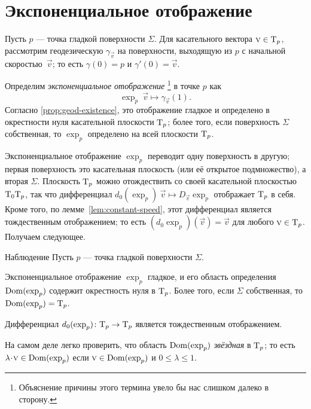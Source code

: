 \section{Экспоненциальное отображение}\label{sec:exp}

Пусть $p$ --- точка гладкой поверхности $\Sigma$.
Для касательного вектора ${\text{\sc{v}}}\in \mathrm{T}_p$, рассмотрим геодезическую $\gamma_{\vec v}$ на поверхности, выходящую из $p$ с начальной скоростью~$\vec v$;
то есть $\gamma(0)=p$ и $\gamma'(0)={\vec v}$.

Определим \emph{экспоненциальное отображение}%
\footnote{Объяснение причины этого термина увело бы нас слишком далеко в сторону.}
в точке $p$ как
\[\exp_p\:\vec v\mapsto \gamma_{\vec v}(1).\]
Согласно \ref{prop:geod-existence}, это отображение гладкое и определено в окрестности нуля касательной плоскости $\mathrm{T}_p$;
более того, если поверхность $\Sigma$ собственная, 
то $\exp_p$ определено на всей плоскости $\mathrm{T}_p$.

Экспоненциальное отображение $\exp_p$ переводит одну поверхность в другую;
первая поверхность это касательная плоскость (или её открытое подмножество), а вторая $\Sigma$.
Плоскость $\mathrm{T}_p$ можно отождествить 
со своей касательной плоскостью $\mathrm{T}_0\mathrm{T}_p$, так что дифференциал $d_0(\exp_p)\:\vec v\mapsto D_{\vec v}\exp_p$ отображает $\mathrm{T}_p$ в себя.
Кроме того, по лемме~\ref{lem:constant-speed}, этот дифференциал является тождественным отображением; то есть $(d_0\exp_p)(\vec v)=
\vec v$ для любого $\text{\sc{v}}\in \mathrm{T}_p$.
Получаем следующее.

\begin{thm}{Наблюдение}\label{obs:d(exp)=1}
Пусть $p$ --- точка гладкой поверхности $\Sigma$.

{\sloppy

\begin{subthm}{}
Экспоненциальное отображение $\exp_p$ гладкое, и его область определения $\mathop{\rm Dom}\nolimits(\exp_p)$ содержит окрестность нуля в $\mathrm{T}_p$.
Более того, если $\Sigma$ собственная, то $\mathop{\rm Dom}\nolimits(\exp_p)=\mathrm{T}_p$.
\end{subthm}

}

\begin{subthm}{}
Дифференциал $d_0(\exp_p)\colon\mathrm{T}_p\to \mathrm{T}_p$ является тождественным отображением.
\end{subthm}

\end{thm}

На самом деле легко проверить, что область $\mathop{\rm Dom}\nolimits(\exp_p)$ \emph{звёздная} в $\mathrm{T}_p$;
то есть $\lambda\cdot\vec v\in \Dom(\exp_p)$ если $\text{\sc{v}}\in \mathop{\rm Dom}\nolimits(\exp_p)$ и $0\le \lambda\le 1$.

